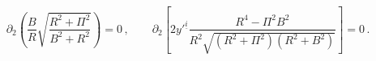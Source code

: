 \begin{equation}
\partial _2\left(\frac{B}{R}\sqrt{\frac{ R^2+\Pi ^2}{B^2+
  R^2}}\right)=0
 \,, \qquad
 \partial _2\left[2y'^{\underline{i}} \frac{ R^4-\Pi ^2B^2}
 { R^2\sqrt{( R^2+\Pi ^2)( R^2+B^2)}} \right]=0 \,.
 \label{eom}
\end{equation}

